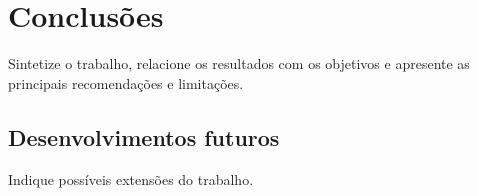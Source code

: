 \chapter{Conclusões}
Sintetize o trabalho, relacione os resultados com os objetivos e apresente as principais recomendações e limitações.

\section{Desenvolvimentos futuros}
Indique possíveis extensões do trabalho.
